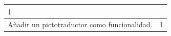 \begin{table}[]
\begin{tabular}{|lc|}
        1                                                                                                                                                                                                            \\ \hline
        \multicolumn{1}{|l|}{Añadir un pictotraductor como funcionalidad.}                                                                                                                                         &
        1                                                                                                                                                                                                            \\ \hline
    \end{tabular}
\end{table}